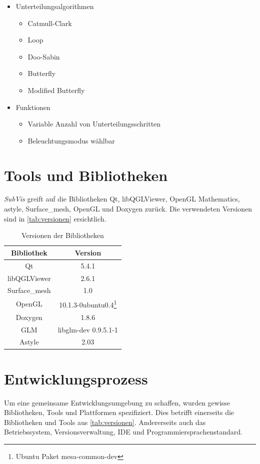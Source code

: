 \begin{itemize}
 \item Unterteilungsalgorithmen
 \begin{itemize}
 	\item Catmull-Clark
 	\item Loop
 	\item Doo-Sabin
 	\item Butterfly
 	\item Modified Butterfly
 \end{itemize}
 \item Funktionen
 \begin{itemize}
  \item Variable Anzahl von Unterteilungsschritten
  \item Beleuchtungsmodus wählbar

 \end{itemize}
\end{itemize}

\section{Tools und Bibliotheken}

\emph{SubVis} greift auf die Bibliotheken Qt, libQGLViewer, OpenGL Mathematics, astyle, Surface\_mesh, OpenGL und Doxygen zurück.
Die verwendeten Versionen sind in \autoref{tab:versionen} ersichtlich.

\begin{table}[h]
\center
\caption{Versionen der Bibliotheken}
\label{tab:versionen}
\begin{tabular}{c|c}
Bibliothek & Version\\
\hline
Qt & 5.4.1\\
libQGLViewer & 2.6.1\\
Surface\_mesh & 1.0\\
OpenGL & 10.1.3-0ubuntu0.4\footnote{Ubuntu Paket mesa-common-dev}\\
Doxygen & 1.8.6\\
GLM & libglm-dev 0.9.5.1-1\\
Astyle & 2.03\\
\end{tabular}
\end{table}

\section{Entwicklungsprozess}

Um eine gemeinsame Entwicklungsumgebung zu schaffen, wurden gewisse Bibliotheken, Tools und Plattformen spezifiziert.
Dies betrifft einerseits die Bibliotheken und Tools aus \autoref{tab:versionen}.
Andererseits auch das Betriebssystem, Versionsverwaltung, IDE und Programmiersprachenstandard.

